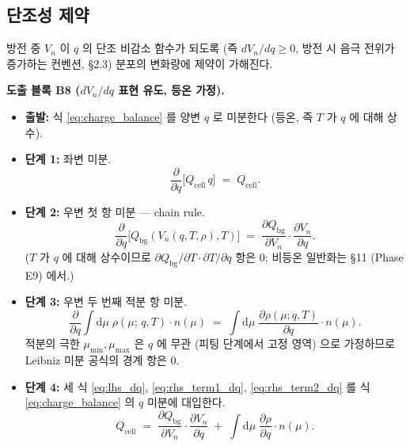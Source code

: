 \documentclass[11pt,a4paper]{article}
\newcommand{\dd}{\mathrm{d}}
\newcommand{\bg}{\mathrm{bg}}
\newcommand{\cell}{\mathrm{cell}}
\newcommand{\mucont}{\mu}
\newcommand{\rhomu}{\rho(\mucont;\, q, T)}
\newcommand{\nmu}{n(\mucont)}
\begin{document}
\subsection{단조성 제약}
\label{sec:monotonicity_constraint}

방전 중 $V_n$ 이 $q$ 의 단조 비감소 함수가 되도록 (즉 $dV_n/dq \ge 0$, 방전 시
음극 전위가 증가하는 컨벤션, \S 2.3) 분포의 변화량에 제약이 가해진다.

\textbf{도출 블록 B8 ($dV_n/dq$ 표현 유도, 등온 가정).}

\begin{itemize}
\item \textbf{출발:} 식 \eqref{eq:charge_balance} 를 양변 $q$ 로 미분한다 (등온,
      즉 $T$ 가 $q$ 에 대해 상수).
\item \textbf{단계 1:} 좌변 미분.
      \begin{equation}
      \frac{\partial}{\partial q}\bigl[Q_{\cell}\, q\bigr] \;=\; Q_{\cell}.
      \label{eq:lhs_dq}
      \end{equation}
\item \textbf{단계 2:} 우변 첫 항 미분 — chain rule.
      \begin{equation}
      \frac{\partial}{\partial q}\bigl[Q_{\bg}(V_n(q, T, \rho), T)\bigr]
      \;=\;
      \frac{\partial Q_{\bg}}{\partial V_n} \cdot \frac{\partial V_n}{\partial q}.
      \label{eq:rhs_term1_dq}
      \end{equation}
      ($T$ 가 $q$ 에 대해 상수이므로 $\partial Q_{\bg}/\partial T \cdot \partial
      T/\partial q$ 항은 0; 비등온 일반화는 \S 11 (Phase E9) 에서.)
\item \textbf{단계 3:} 우변 두 번째 적분 항 미분.
      \begin{equation}
      \frac{\partial}{\partial q}
      \int \dd\mucont \;\rhomu \cdot \nmu
      \;=\;
      \int \dd\mucont\;\frac{\partial \rho(\mucont; q, T)}{\partial q} \cdot \nmu.
      \label{eq:rhs_term2_dq}
      \end{equation}
      적분의 극한 $\mucont_{\min}, \mucont_{\max}$ 은 $q$ 에 무관 (피팅 단계에서
      고정 영역) 으로 가정하므로 Leibniz 미분 공식의 경계 항은 0.
\item \textbf{단계 4:} 세 식 \eqref{eq:lhs_dq}, \eqref{eq:rhs_term1_dq},
      \eqref{eq:rhs_term2_dq} 를 식 \eqref{eq:charge_balance} 의 $q$ 미분에
      대입한다.
      \begin{equation}
      Q_{\cell}
      \;=\;
      \frac{\partial Q_{\bg}}{\partial V_n} \cdot \frac{\partial V_n}{\partial q}
      \;+\;
      \int \dd\mucont\;\frac{\partial \rho}{\partial q} \cdot \nmu.

\end{equation}
\end{itemize}
\end{document}
